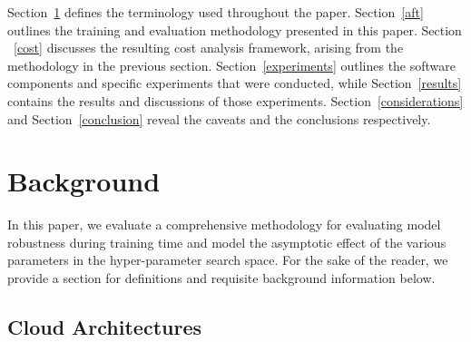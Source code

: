 \documentclass[sn-mathphys-num]{sn-jnl}%
\begin{document}
Section~\ref{background} defines the terminology used throughout the paper. Section~\ref{aft} outlines the training and evaluation methodology presented in this paper.  Section ~\ref{cost} discusses the resulting cost analysis framework, arising from the methodology in the previous section. Section~\ref{experiments} outlines the software components and specific experiments that were conducted, while Section~\ref{results} contains the results and discussions of those experiments. Section~\ref{considerations} and Section~\ref{conclusion} reveal the caveats and the conclusions respectively.


\section{Background}
\label{background}



In this paper, we evaluate a comprehensive methodology for evaluating model robustness during training time and model the asymptotic effect of the various parameters in the hyper-parameter search space. For the sake of the reader, we provide a section for definitions and requisite background information below.


\subsection{Cloud Architectures}
\end{document}

